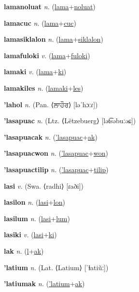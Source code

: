 \textbf{\hypertarget{lamanoluat}{lamanoluat}} \textit{n.} (\hyperlink{lama}{lama}+\allowbreak \hyperlink{noluat}{noluat})


\textbf{\hypertarget{lamacuc}{lamacuc}} \textit{n.} (\hyperlink{lama}{lama}+\allowbreak \hyperlink{cuc}{cuc})


\textbf{\hypertarget{lamasiklalon}{lamasiklalon}} \textit{n.} (\hyperlink{lama}{lama}+\allowbreak \hyperlink{siklalon}{siklalon})


\textbf{\hypertarget{lamafuloki}{lamafuloki}} \textit{v.} (\hyperlink{lama}{lama}+\allowbreak \hyperlink{fuloki}{fuloki})


\textbf{\hypertarget{lamaki}{lamaki}} \textit{v.} (\hyperlink{lama}{lama}+\allowbreak \hyperlink{ki}{ki})


\textbf{\hypertarget{lamakiles}{lamakiles}} \textit{n.} (\hyperlink{lamaki}{lamaki}+\allowbreak \hyperlink{les}{les})


\textbf{\hypertarget{'lahol}{'lahol}} \textit{n.} (Pan. ⟨{\gurmukhi{}ਲਾਹੌਰ}⟩ [ləˈhɔːɾ])


\textbf{\hypertarget{'lasapuac}{'lasapuac}} \textit{n.} (Ltz. ⟨Lëtzebuerg⟩ [lət͡səbuːəɕ])


\textbf{\hypertarget{'lasapuacak}{'lasapuacak}} \textit{n.} (\hyperlink{'lasapuac}{'lasapuac}+\allowbreak \hyperlink{ak}{ak})


\textbf{\hypertarget{'lasapuacwon}{'lasapuacwon}} \textit{n.} (\hyperlink{'lasapuac}{'lasapuac}+\allowbreak \hyperlink{won}{won})


\textbf{\hypertarget{'lasapuactilip}{'lasapuactilip}} \textit{n.} (\hyperlink{'lasapuac}{'lasapuac}+\allowbreak \hyperlink{tilip}{tilip})


\textbf{\hypertarget{lasi}{lasi}} \textit{v.} (Swa. ⟨radhi⟩ [ɾaði])


\textbf{\hypertarget{lasilon}{lasilon}} \textit{n.} (\hyperlink{lasi}{lasi}+\allowbreak \hyperlink{lon}{lon})


\textbf{\hypertarget{lasilum}{lasilum}} \textit{n.} (\hyperlink{lasi}{lasi}+\allowbreak \hyperlink{lum}{lum})


\textbf{\hypertarget{lasiki}{lasiki}} \textit{v.} (\hyperlink{lasi}{lasi}+\allowbreak \hyperlink{ki}{ki})


\textbf{\hypertarget{lak}{lak}} \textit{n.} (\hyperlink{l}{l}+\allowbreak \hyperlink{ak}{ak})


\textbf{\hypertarget{'latium}{'latium}} \textit{n.} (Lat. ⟨Latium⟩ [ˈɫatiũː])


\textbf{\hypertarget{'latiumak}{'latiumak}} \textit{n.} (\hyperlink{'latium}{'latium}+\allowbreak \hyperlink{ak}{ak})


